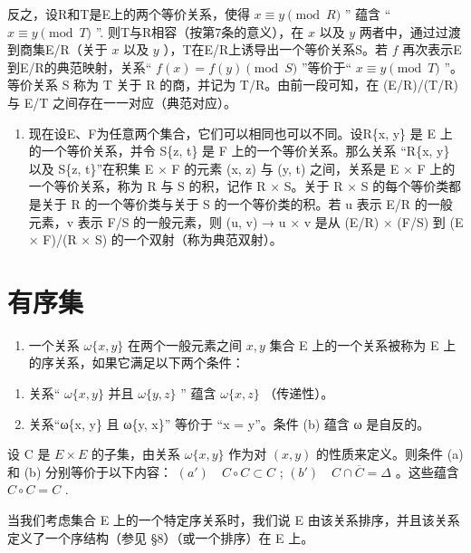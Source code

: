 反之，设R和T是E上的两个等价关系，使得 \(x \equiv y \pmod{R}\) '' 蕴含 `` \(x \equiv y \pmod{T}\) ''. 则T与R相容（按第7条的意义），在 \(x\) 以及 \(y\) 两者中，通过过渡到商集E/R（关于 \(x\) 以及 \(y\) ），T在E/R上诱导出一个等价关系S。若 \(f\) 再次表示E到E/R的典范映射，关系“ \(f(x) = f(y) \pmod{S}\) ”等价于“ \(x \equiv y \pmod{T}\) ''。等价关系 S 称为 T 关于 R 的商，并记为 T/R。由前一段可知，在 (E/R)/(T/R) 与 E/T 之间存在一一对应（典范对应）。

\begin{enumerate}
\def\labelenumi{\arabic{enumi}.}
\setcounter{enumi}{9}
\tightlist
\item
  现在设E、F为任意两个集合，它们可以相同也可以不同。设R\{x, y\} 是 E 上的一个等价关系，并令 S\{z, t\} 是 F 上的一个等价关系。那么关系 “R\{x, y\} 以及 S\{z, t\}''在积集 E × F 的元素 (x, z) 与 (y, t) 之间，关系是 E × F 上的一个等价关系，称为 R 与 S 的积，记作 R × S。关于 R × S 的每个等价类都是关于 R 的一个等价类与关于 S 的一个等价类的积。若 u 表示 E/R 的一般元素，v 表示 F/S 的一般元素，则 (u, v) → u × v 是从 (E/R) × (F/S) 到 (E × F)/(R × S) 的一个双射（称为典范双射）。
\end{enumerate}

\section{有序集}

\begin{enumerate}
\def\labelenumi{\arabic{enumi}.}
\tightlist
\item
  一个关系 \(\omega\{x, y\}\) 在两个一般元素之间 \(x, y\) 集合 E 上的一个关系被称为 E 上的序关系，如果它满足以下两个条件：
\end{enumerate}

\begin{enumerate}
\def\labelenumi{(\alph{enumi})}
\item
  关系“ \(\omega \{x, y\}\) 并且 \(\omega \{y, z\}\) '' 蕴含 \(\omega \{x, z\}\) （传递性）。
\item
  关系“ω\{x, y\} 且 ω\{y, x\}'' 等价于 “x = y''。条件 (b) 蕴含 ω 是自反的。
\end{enumerate}

设 C 是 \(E \times E\) 的子集，由关系 \(\omega\{x, y\}\) 作为对 \((x, y)\) 的性质来定义。则条件 (a) 和 (b) 分别等价于以下内容： \((a') \quad C \circ C \subset C\) ; \((b') \quad C \cap \overline{C} = \Delta\) 。这些蕴含 \(C \circ C = C\) .

当我们考虑集合 E 上的一个特定序关系时，我们说 E 由该关系排序，并且该关系定义了一个序结构（参见 §8）（或一个排序）在 E 上。

